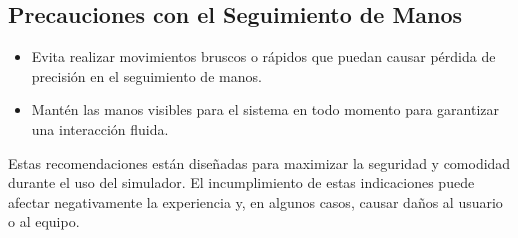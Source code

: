\subsection{Precauciones con el Seguimiento de Manos}
\begin{itemize}
    \item Evita realizar movimientos bruscos o rápidos que puedan causar pérdida de precisión en el seguimiento de manos.
    \item Mantén las manos visibles para el sistema en todo momento para garantizar una interacción fluida.
\end{itemize}

Estas recomendaciones están diseñadas para maximizar la seguridad y comodidad durante el uso del simulador. El incumplimiento de estas indicaciones puede afectar negativamente la experiencia y, en algunos casos, causar daños al usuario o al equipo.
